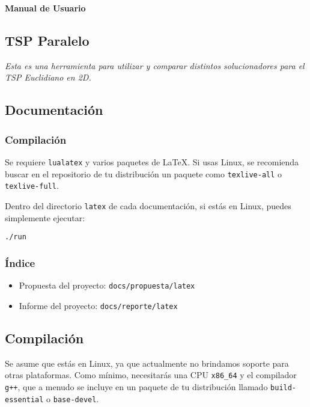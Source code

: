 \documentclass[main.tex]{subfiles}
\begin{document}
\begin{cajaEnunciado}
    \textbf{Manual de Usuario}
\end{cajaEnunciado}

\vspace*{2mm}

\begin{mdframed}[linewidth=2pt]

\section*{TSP Paralelo}
\emph{Esta es una herramienta para utilizar y comparar distintos solucionadores para el TSP Euclidiano en 2D.}

\subsection*{Documentación}
\subsubsection*{Compilación}
Se requiere \texttt{lualatex} y varios paquetes de LaTeX. Si usas Linux, se recomienda buscar en el repositorio de tu distribución un paquete como \texttt{texlive-all} o \texttt{texlive-full}.  

Dentro del directorio \texttt{latex} de cada documentación, si estás en Linux, puedes simplemente ejecutar:
\begin{verbatim}
./run
\end{verbatim}

\subsubsection*{Índice}
\begin{itemize}
  \item Propuesta del proyecto: \texttt{docs/propuesta/latex}
  \item Informe del proyecto:   \texttt{docs/reporte/latex}
\end{itemize}

\subsection*{Compilación}
Se asume que estás en Linux, ya que actualmente no brindamos soporte para otras plataformas.  
Como mínimo, necesitarás una CPU \texttt{x86\_64} y el compilador \texttt{g++}, que a menudo se incluye en un paquete de tu distribución llamado \texttt{build-essential} o \texttt{base-devel}.


\end{mdframed}
\end{document}
